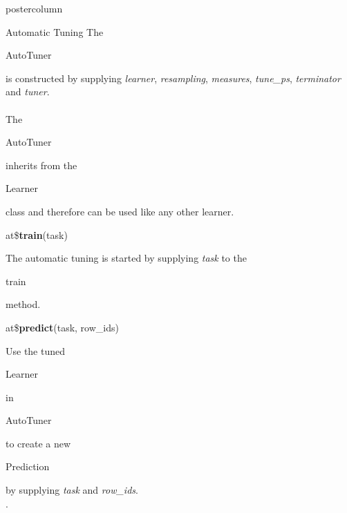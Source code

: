 \documentclass{beamer}
\newcommand{\codeinline}[1]{\begin{codeboxinline}#1\end{codeboxinline}}
\begin{document}
\begin{frame}[fragile]{}
\begin{columns}
\begin{column}{.245\textwidth}
\begin{beamercolorbox}[center]{postercolumn}
\begin{minipage}{.98\textwidth}
{\begin{myblock}{Automatic Tuning}
						The \codeinline{AutoTuner} is constructed by supplying \textit{learner}, \textit{resampling}, \textit{measures}, \textit{tune\_ps}, \textit{terminator} and \textit{tuner}. 
						\\
						\\
						The \codeinline{AutoTuner} inherits from the \codeinline{Learner} class and therefore can be used like any other learner.
						\\
						\begin{codebox}
							at\$\textbf{train}(task)
						\end{codebox}
						The automatic tuning is started by supplying \textit{task} to the \codeinline{train} method.
						\\
						\begin{codebox}
							at\$\textbf{predict}(task, row\_ids)
						\end{codebox}
						Use the tuned \codeinline{Learner} in \codeinline{AutoTuner} to create a new \codeinline{Prediction} by supplying \textit{task} and \textit{row\_ids}.
						\\
						.
						\end{myblock}
					\vfill}
				\end{minipage}
			\end{beamercolorbox}
		\end{column}
	\end{columns}
\end{frame}
\end{document}
